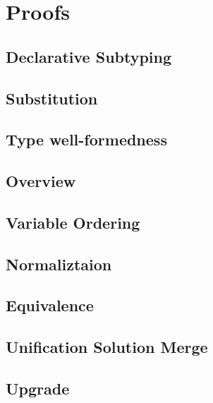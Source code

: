 \documentclass[a4,natbib=false]{article}
\begin{document}
\section{Proofs}

\subsection{Declarative Subtyping}


\subsection{Substitution}


\subsection{Type well-formedness}


\subsection{Overview}



\subsection{Variable Ordering}


\subsection{Normaliztaion}


\subsection{Equivalence}



\subsection{Unification Solution Merge}


\subsection{Upgrade}

\end{document}
